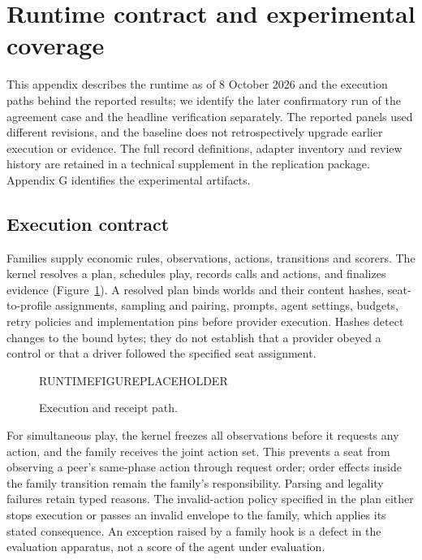 \section{Runtime contract and experimental coverage}
\label{app:runtime}

This appendix describes the runtime as of 8 October 2026
and the execution paths behind the reported results; we identify the
later confirmatory run of the agreement case and the headline verification separately. The reported
panels used different revisions, and the baseline does not retrospectively
upgrade earlier execution or evidence. The full record definitions,
adapter inventory and review history are retained in a technical supplement in the
replication package. Appendix G identifies the experimental artifacts.

\subsection{Execution contract}
\label{app:runtime-overview}

Families supply economic rules, observations, actions, transitions and
scorers. The kernel resolves a plan, schedules play, records calls and
actions, and finalizes evidence (Figure~\ref{fig:runtime}). A resolved
plan binds worlds and their content hashes, seat-to-profile assignments,
sampling and pairing, prompts, agent settings, budgets, retry policies and
implementation pins before provider execution. Hashes detect changes to
the bound bytes; they do not establish that a provider obeyed a control
or that a driver followed the specified seat assignment.

\begin{figure}[htbp]
\centering
RUNTIMEFIGUREPLACEHOLDER
\caption{Execution and receipt path.}
\label{fig:runtime}
\end{figure}

For simultaneous play, the kernel freezes all observations before it requests any
action, and the family receives the joint action set. This prevents a
seat from observing a peer's same-phase action through request order;
order effects inside the family transition remain the family's
responsibility. Parsing and legality failures retain typed reasons.
The invalid-action policy specified in the plan either stops execution or passes an
invalid envelope to the family, which applies its stated consequence. An exception raised by a family
hook is a defect in the evaluation apparatus, not a score of the agent under evaluation.

